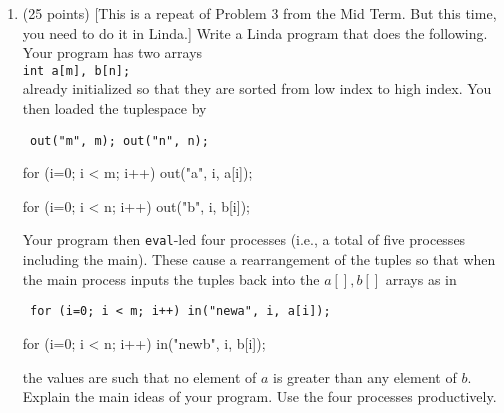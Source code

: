 \begin{enumerate}
\item (25 points)  [This is a repeat of Problem 3 from the Mid Term.
But this time, you need to do it in Linda.]  
Write a Linda program that does the following.
\parskip=0pt
Your program has two arrays\\

{\tt int a[m], b[n];}\\

already initialized so that they are sorted from low index to high
index.  You then loaded the tuplespace by\\

{\tt
out("m", m); out("n", n);\par
for (i=0; i < m; i++) out("a", i, a[i]);\par
for (i=0; i < n; i++) out("b", i, b[i]);\\
}

Your program then \verb|eval|-led four processes (i.e., a total of
five processes including the main).  These cause a rearrangement of
the tuples so that when the main process inputs the tuples back into
the $a[], b[]$ arrays as in\\

{\tt
for (i=0; i < m; i++) in("newa", i, a[i]);\par
for (i=0; i < n; i++) in("newb", i, b[i]);\\
}

the values are such that no element of $a$ is greater than any element
of $b$.  Explain the main ideas of your program.  Use the
four processes productively.

\end{enumerate}


